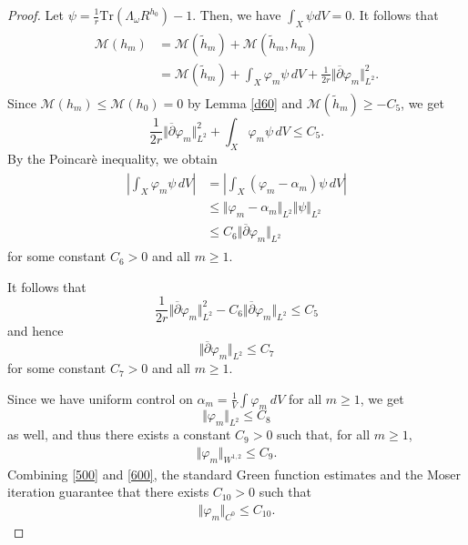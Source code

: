 \documentclass[11pt]{amsart}
\numberwithin{equation}{section}
\theoremstyle{remark}
\renewcommand{\bar}{\overline}
\newcommand{\pa}{\partial}
\renewcommand{\phi}{\varphi}
\newcommand{\wt}{\widetilde}
\newcommand{\M}{{\mathcal M}}
\newcommand{\lb}{\left (}
\newcommand{\rb}{\right )}
\newcommand{\ga}{\alpha}
\newcommand{\tr}{\text{Tr}}
\begin{document}
\begin{proof}
Let $\psi=\frac 1 r\tr \lb\Lambda_\omega R^{ h_0}\rb-1$. Then, we have $\int_X \psi dV=0$. It follows that
\begin{align}\label{550}
\begin{split}
\M(h_m)& =\M\lb \wt h_m\rb+\M\lb \wt h_m,h_m\rb \\
 &=\M\lb \wt h_m\rb+ \int_X \phi_m\psi\, dV +\frac{1}{2r}\Vert\bar\pa\phi_m\Vert_{L^2}^2.
\end{split}
\end{align}
Since $\M\lb h_m\rb\leq \M\lb h_0\rb=0$ by Lemma \ref{d60} and $\M\lb \wt h_m\rb\geq -C_5$, we get
\[
\frac{1}{2r}\Vert\bar\pa\phi_m\Vert_{L^2}^2 +\int_X \phi_m\psi\, dV \leq C_5.
\]
By the Poincar\`e inequality, we obtain
\begin{align*}
\begin{split}
\left | \int_X \phi_m \psi\, dV\right | & =\left | \int_X \lb \phi_m-\ga_m\rb \psi\, dV\right |\\
& \leq \Vert \phi_m-\ga_m\Vert_{L^2}\Vert\psi\Vert_{L^2} \\
& \leq C_6\Vert \bar\pa\phi_m\Vert_{L^2}
\end{split}
\end{align*}
for some constant $C_6>0$ and all $m\geq 1$.

It follows that
\[
\frac{1}{2r}\Vert\bar\pa\phi_m\Vert_{L^2}^2-C_6\Vert \bar\pa\phi_m\Vert_{L^2}\leq C_5
\]
and hence
\[
\Vert \bar\pa\phi_m\Vert_{L^2}\leq C_7
\] for some constant $C_7>0$ and all $m\geq 1$.

Since we have uniform control on $\ga_m=\frac 1V \int \phi_m\ dV$ for all $m\geq 1$, we get
\[\Vert \phi_m\Vert_{L^2}\leq C_8\]
as well, and thus there exists a constant $C_9>0$ such that, for all $m\geq 1$,
\begin{eqnarray}\label{600}
\Vert\phi_m\Vert_{W^{1,2}}\leq C_9.
\end{eqnarray}
Combining \eqref{500} and \eqref{600}, the standard Green function estimates and the Moser iteration guarantee that there exists $C_{10}>0$ such that
\begin{eqnarray}\label{700}
\Vert\phi_m\Vert_{C^0}\leq C_{10}.
\end{eqnarray}


\end{proof}
\end{document}
